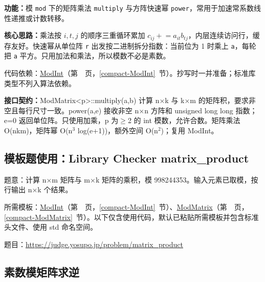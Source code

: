 \noindent\textbf{功能：}\allowbreak 模 \texttt{mod} 下的矩阵乘法 \texttt{multiply} 与方阵快速幂 \texttt{power}，常用于加速常系数线性递推或计数转移。

\textbf{核心思路：}\allowbreak 乘法按 $i,t,j$ 的顺序三重循环累加 $c_{ij}\mathrel{+}=a_{it}b_{tj}$，内层连续访问行，缓存友好。快速幂从单位阵 \texttt{r} 出发按二进制拆分指数：当前位为 1 时乘上 \texttt{a}，每轮把 \texttt{a} 平方。只用加法和乘法，所以模数不必是素数。

代码依赖：\hyperref[compact-ModInt]{ModInt}（第~\pageref{compact-ModInt}~页，\ref{compact-ModInt}~节）。抄写时一并准备；标准库类型不列入算法依赖。

{\sloppy{}\noindent\textbf{接口契约：}ModMatrix<p>::multiply(a,b) 计算 n×k 与 k×m 的矩阵积，要求非空且每行尺寸一致。power(a,e) 接收非空 n×n 方阵和 unsigned long long 指数；e=0 返回单位阵。只使用加乘，p 为$\ge$2 的 int 模数，允许合数。矩阵乘法 O(nkm)，矩阵幂 O(n$^{3}$ log(e+1))，额外空间 O(n$^{2}$)；复用 ModInt。\par}



\Needspace{334pt}

\subsection*{模板题使用：Library Checker matrix\_product}

\label{usage-example-26}

题意：计算 n×m 矩阵与 m×k 矩阵的乘积，模 998244353。输入元素已取模，按行输出 n×k 个结果。

所需模板：\hyperref[compact-ModInt]{ModInt}（第~\pageref{compact-ModInt}~页，\ref{compact-ModInt}~节）、\hyperref[compact-ModMatrix]{ModMatrix}（第~\pageref{compact-ModMatrix}~页，\ref{compact-ModMatrix}~节）。以下仅含使用代码，默认已粘贴所需模板并包含标准头文件、使用 std 命名空间。

题目：\url{https://judge.yosupo.jp/problem/matrix_product}



\newpage

\Needspace{499pt}

\subsection{素数模矩阵求逆}\label{compact-matrix_inverse}


